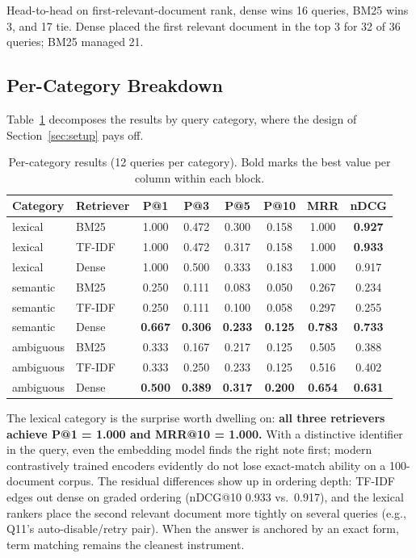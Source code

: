 \documentclass[11pt,a4paper]{article}
\begin{document}
Head-to-head on first-relevant-document rank, dense wins 16 queries, BM25 wins 3, and 17 tie. Dense placed the first relevant document in the top 3 for 32 of 36 queries; BM25 managed 21.

\subsection{Per-Category Breakdown}

Table~\ref{tab:category} decomposes the results by query category, where the design of Section~\ref{sec:setup} pays off.

\begin{table}[htbp]
\centering
\caption{Per-category results (12 queries per category). Bold marks the best value per column within each block.}
\label{tab:category}
\small
\begin{tabular*}{\columnwidth}{@{\extracolsep{\fill}} ll cccccc}
\toprule
Category & Retriever & P@1 & P@3 & P@5 & P@10 & MRR & nDCG \\
\midrule
lexical & BM25 & 1.000 & 0.472 & 0.300 & 0.158 & 1.000 & \textbf{0.927} \\
lexical & TF-IDF & 1.000 & 0.472 & 0.317 & 0.158 & 1.000 & \textbf{0.933} \\
lexical & Dense & 1.000 & 0.500 & 0.333 & 0.183 & 1.000 & 0.917 \\
\addlinespace[2pt]
semantic & BM25 & 0.250 & 0.111 & 0.083 & 0.050 & 0.267 & 0.234 \\
semantic & TF-IDF & 0.250 & 0.111 & 0.100 & 0.058 & 0.297 & 0.255 \\
semantic & Dense & \textbf{0.667} & \textbf{0.306} & \textbf{0.233} & \textbf{0.125} & \textbf{0.783} & \textbf{0.733} \\
\addlinespace[2pt]
ambiguous & BM25 & 0.333 & 0.167 & 0.217 & 0.125 & 0.505 & 0.388 \\
ambiguous & TF-IDF & 0.333 & 0.250 & 0.233 & 0.125 & 0.516 & 0.402 \\
ambiguous & Dense & \textbf{0.500} & \textbf{0.389} & \textbf{0.317} & \textbf{0.200} & \textbf{0.654} & \textbf{0.631} \\
\bottomrule
\end{tabular*}
\end{table}

The lexical category is the surprise worth dwelling on: \textbf{all three retrievers achieve P@1 = 1.000 and MRR@10 = 1.000.} With a distinctive identifier in the query, even the embedding model finds the right note first; modern contrastively trained encoders evidently do not lose exact-match ability on a 100-document corpus. The residual differences show up in ordering depth: TF-IDF edges out dense on graded ordering (nDCG@10 0.933 vs.\ 0.917), and the lexical rankers place the second relevant document more tightly on several queries (e.g., Q11's auto-disable/retry pair). When the answer is anchored by an exact form, term matching remains the cleanest instrument.
\end{document}

